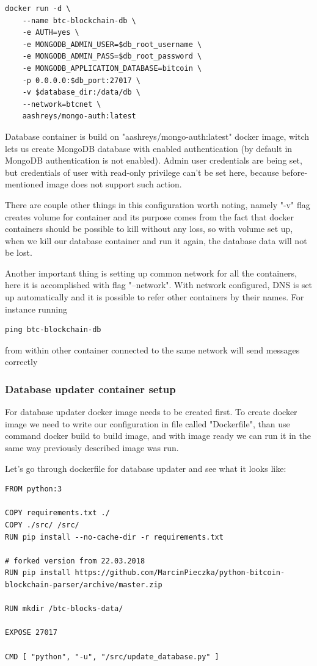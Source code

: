 \documentclass[12pt, en, eng]{mgr}
\begin{document}
\begin{verbatim}
docker run -d \
    --name btc-blockchain-db \
    -e AUTH=yes \
    -e MONGODB_ADMIN_USER=$db_root_username \
    -e MONGODB_ADMIN_PASS=$db_root_password \
    -e MONGODB_APPLICATION_DATABASE=bitcoin \
    -p 0.0.0.0:$db_port:27017 \
    -v $database_dir:/data/db \
    --network=btcnet \
    aashreys/mongo-auth:latest
\end{verbatim}

Database container is build on "aashreys/mongo-auth:latest" docker image, witch lets us create MongoDB database with enabled authentication (by default in MongoDB authentication is not enabled).
Admin user credentials are being set, but credentials of user with read-only privilege can't be set here, because before-mentioned image does not support such action.

There are couple other things in this configuration worth noting, namely "-v" flag creates volume for container and its purpose comes from the fact that docker containers should be possible to kill without any loss, so with volume set up, when we kill our database container and run it again, the database data will not be lost.

Another important thing is setting up common network for all the containers, here it is accomplished with flag "--network". With network configured, DNS is set up automatically and it is possible to refer other containers by their names. For instance running 
\begin{verbatim}
ping btc-blockchain-db
\end{verbatim}  
from within other container connected to the same network will send messages correctly

\subsubsection{Database updater container setup}
For database updater docker image needs to be created first. To create docker image we need to write our configuration in file called "Dockerfile", than use command docker build to build image, and with image ready we can run it in the same way previously described image was run.

Let's go through dockerfile for database updater and see what it looks like:
\begin{verbatim}
FROM python:3

COPY requirements.txt ./
COPY ./src/ /src/
RUN pip install --no-cache-dir -r requirements.txt

# forked version from 22.03.2018
RUN pip install https://github.com/MarcinPieczka/python-bitcoin-blockchain-parser/archive/master.zip

RUN mkdir /btc-blocks-data/

EXPOSE 27017

CMD [ "python", "-u", "/src/update_database.py" ]
\end{verbatim}
\end{document}
